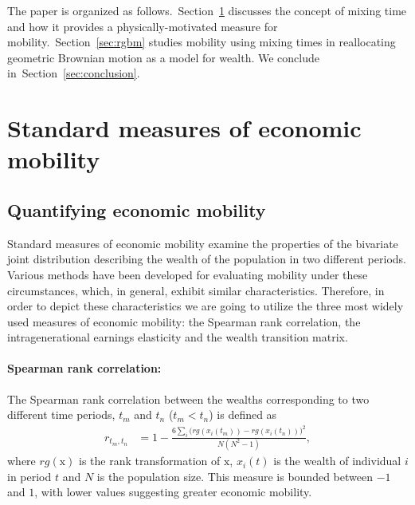 \documentclass[11pt]{article}
\newcommand{\Sref}[1]{Section~\ref{sec:#1}}
\numberwithin{equation}{section}
\begin{document}
The paper is organized as follows.~\Sref{mixingtime} discusses the concept of mixing time and how it provides a physically-motivated measure for mobility.~\Sref{rgbm} studies mobility using mixing times in reallocating geometric Brownian motion as a model for wealth. We conclude in~\Sref{conclusion}.

\section{Standard measures of economic mobility}\label{sec:mixingtime}

\subsection{Quantifying economic mobility}


Standard measures of economic mobility examine the properties of the bivariate joint distribution describing the wealth of the population in two different periods. Various methods have been developed for evaluating mobility under these circumstances, which, in general, exhibit similar characteristics. Therefore, in order to depict these characteristics we are going to utilize the three most widely used measures of economic mobility: the Spearman rank correlation, the intragenerational earnings elasticity and the wealth transition matrix. 

\paragraph{Spearman rank correlation:} The Spearman rank correlation between the wealths corresponding to two different time periods, $t_m$ and $t_n$ ($t_m < t_n$) is defined as
\begin{align*}
    r_{t_m,t_n} &= 1 - \frac{6\sum_i \big(rg(x_i(t_m)) - rg(x_i(t_n))\big)^2}{N(N^2-1)},
\end{align*}
where $rg(\mathrm{x})$ is the rank transformation of $\mathrm{x}$, $x_i(t)$ is the wealth of individual $i$ in period $t$ and $N$ is the population size. This measure is bounded between $-1$ and $1$, with lower values suggesting greater economic mobility.
\end{document}
